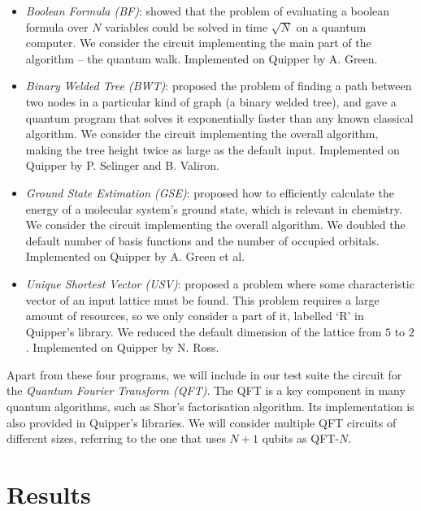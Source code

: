\begin{itemize}
\item \textit{Boolean Formula (BF)}: \citet{BFWalk} showed that the problem of evaluating a boolean formula over \(N\) variables could be solved in time \(\sqrt{N}\) on a quantum computer. We consider the circuit implementing the main part of the algorithm -- the quantum walk. Implemented on Quipper by A. Green.

\item \textit{Binary Welded Tree (BWT)}: \citet{BWT} proposed the problem of finding a path between two nodes in a particular kind of graph (a binary welded tree), and gave a quantum program that solves it exponentially faster than any known classical algorithm. We consider the circuit implementing the overall algorithm, making the tree height twice as large as the default input. Implemented on Quipper by P. Selinger and B. Valiron.

\item \textit{Ground State Estimation (GSE)}: \citet{GSE} proposed how to efficiently calculate the energy of a molecular system's ground state, which is relevant in chemistry. We consider the circuit implementing the overall algorithm. We doubled the default number of basis functions and the number of occupied orbitals. Implemented on Quipper by A. Green et al.

\item \textit{Unique Shortest Vector (USV)}: \citet{USV} proposed a problem where some characteristic vector of an input lattice must be found. This problem requires a large amount of resources, so we only consider a part of it, labelled `R' in Quipper's library. We reduced the default dimension of the lattice from \(5\) to \(2\). Implemented on Quipper by N. Ross.
\end{itemize}

Apart from these four programs, we will include in our test suite the circuit for the \textit{Quantum Fourier Transform (QFT)}. The QFT is a key component in many quantum algorithms, such as Shor's factorisation algorithm. Its implementation is also provided in Quipper's libraries. We will consider multiple QFT circuits of different sizes, referring to the one that uses \(N\!+\!1\) qubits as QFT-\(N\).

\section{Results}
\label{Results}

